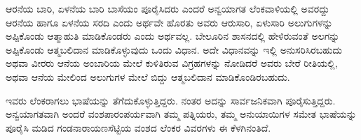 ಆರನೆಯ ಬಾರಿ, ಏಳನೆಯ ಬಾರಿ ಬಾಸೆಯಂ ಪೂರೈಸಿದರು ಎಂದರೆ ಅನ್ವಯಾಗತ ಲೆಂಕವಾಳಿಯಲ್ಲಿ ಅವರದ್ದು ಆರನೆಯ ಹಾಗೂ ಏಳನೆಯ ಸರದಿ ಎಂದು ಅರ್ಥವೇ ಹೊರತು ಅವರು ಆರುಸಾರಿ, ಏಳುಸಾರಿ ಅಲುಗುಗಳನ್ನು ಅಪ್ಪಿಕೊಂಡು ಆತ್ಮಾಹುತಿ ಮಾಡಿಕೊಂಡರು ಎಂದು ಅರ್ಥವಲ್ಲ. ಬೇಲೂರಿನ ಶಾಸನದಲ್ಲಿ ಹೇಳಿರುವಂತೆ ಅಲಗನ್ನು ಅಪ್ಪಿಕೊಂಡು ಆತ್ಮಬಲಿದಾನ ಮಾಡಿಕೊಳ್ಳುವುದು ಒಂದು ವಿಧಾನ. ಅದೇ ವಿಧಾನವನ್ನು ಇಲ್ಲಿ ಅನುಸರಿಸಿರಬಹುದು ಅಥವಾ ವೀರರು ಆನೆಯ ಅಂಬಾರಿಯ ಮೇಲೆ ಕುಳಿತಿರುವ ವಿಗ್ರಹಗಳನ್ನು ನೋಡಿದರೆ ಅವರು ಬೇರೆ ರೀತಿಯಲ್ಲಿ, ಅಥವಾ ಆನೆಯ ಮೇಲಿಂದ ಅಲುಗುಗಳ ಮೇಲೆ ಬಿದ್ದು ಆತ್ಮಬಲಿದಾನ ಮಾಡಿಕೊಂಡಿರಬಹುದು.

ಇವರು ಲೆಂಕರಾಗಲು ಭಾಷೆಯನ್ನು ತೆಗೆದುಕೊಳ್ಳುತ್ತಿದ್ದರು. ನಂತರ ಅದನ್ನು ಸಾರ್ವಜನಿಕವಾಗಿ ಪೂರೈಸುತ್ತಿದ್ದರು. ಅನ್ವಯಾಗತವಾಗಿ ಅಂದರೆ ವಂಶಪಾರಂಪರ್ಯವಾಗಿ ತಮ್ಮ ಪತ್ನಿಯರು, ತಮ್ಮ ಅನುಯಾಯಿಗಳ ಸಮೇತ ಭಾಷೆಯನ್ನು ಪೂರೈಸಿ ಮಡಿದ ಗಂಡನಾರಾಯಣಸೆಟ್ಟಿಯ ವಂಶದ ಲೆಂಕರ ವಿವರಗಳು ಈ ಕೆಳಗಿನಂತಿದೆ.

